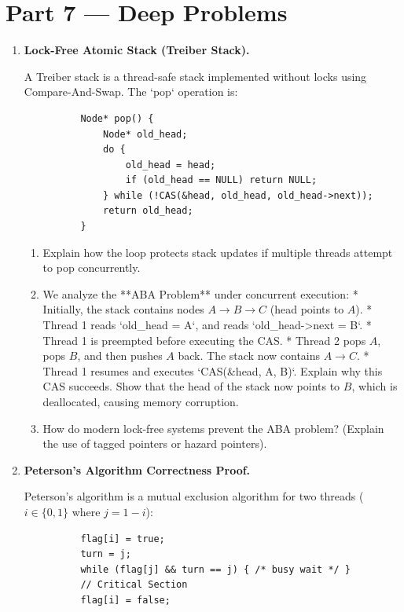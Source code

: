 \documentclass[12pt, a4paper]{book}
\begin{document}
\newpage

\section{Part 7 --- Deep Problems}

\begin{deepbox}
\begin{enumerate}[label=\textbf{D\arabic*.}]
  \item \textbf{Lock-Free Atomic Stack (Treiber Stack).}
  
        A Treiber stack is a thread-safe stack implemented without locks using Compare-And-Swap.
        The `pop` operation is:
        \begin{verbatim}
          Node* pop() {
              Node* old_head;
              do {
                  old_head = head;
                  if (old_head == NULL) return NULL;
              } while (!CAS(&head, old_head, old_head->next));
              return old_head;
          }
        \end{verbatim}
        
        \begin{enumerate}[label=(\alph*)]
          \item Explain how the loop protects stack updates if multiple threads attempt to pop concurrently.
          \item We analyze the **ABA Problem** under concurrent execution:
                * Initially, the stack contains nodes $A \to B \to C$ (head points to $A$).
                * Thread 1 reads `old_head = A`, and reads `old_head->next = B`.
                * Thread 1 is preempted before executing the CAS.
                * Thread 2 pops $A$, pops $B$, and then pushes $A$ back. The stack now contains $A \to C$.
                * Thread 1 resumes and executes `CAS(&head, A, B)`.
                Explain why this CAS succeeds. Show that the head of the stack now points to $B$, which is deallocated, causing memory corruption.
          \item How do modern lock-free systems prevent the ABA problem? (Explain the use of tagged pointers or hazard pointers).
        \end{enumerate}

  \item \textbf{Peterson's Algorithm Correctness Proof.}
  
        Peterson's algorithm is a mutual exclusion algorithm for two threads ($i \in \{0, 1\}$ where $j = 1 - i$):
        \begin{verbatim}
          flag[i] = true;
          turn = j;
          while (flag[j] && turn == j) { /* busy wait */ }
          // Critical Section
          flag[i] = false;
        \end{verbatim}
        

\end{enumerate}
\end{deepbox}
\end{document}
